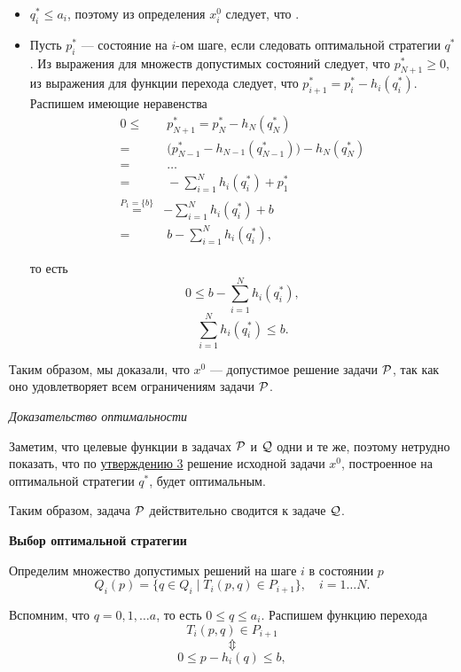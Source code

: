 \begin{itemize}[nosep]
	\item $q_i^* \le a_i$, поэтому из определения $x_i^0$ следует, что .
		
	\item Пусть $p_i^*$ --- состояние на $i$-ом шаге, если следовать оптимальной стратегии $q^*$.  Из выражения для множеств допустимых состояний следует, что $p_{N+1}^* \ge 0$, из выражения для функции перехода следует, что $p_{i+1}^* = p_i^* - h_i (q_i^*)$. Распишем имеющие неравенства
	\begin{align*}
		0 \le& \; p_{N+1}^* = p_N^* - h_N (q_N^*) \\
		=& \; \big(p_{N-1}^* - h_{N-1}(q_{N-1}^*)\big) - h_N (q_N^*) \\
		=& \; \dots \\
		=& \; -\sum_{i=1}^N h_i(q_i^*) + p_1^* \\
		\stackrel{P_1=\{b\}}{=}& -\sum_{i=1}^N h_i(q_i^*) + b \\
		=& \; b - \sum_{i=1}^N h_i(q_i^*),
	\end{align*}
	
	то есть
	\[0 \le b - \sum_{i=1}^N h_i(q_i^*),\]
	\[\boxed{\sum_{i=1}^N h_i(q_i^*) \le b}.\]
\end{itemize}

Таким образом, мы доказали, что $x^0$ --- допустимое решение задачи $\P$, так как оно удовлетворяет всем ограничениям задачи $\P$.

\bigskip

\textit{Доказательство оптимальности}

Заметим, что целевые функции в задачах $\P$ и $\Q$ одни и те же, поэтому нетрудно показать, что по \hyperref[fact:reduction_to_other_problem]{утверждению 3} решение исходной задачи $x^0$, построенное на оптимальной стратегии $q^*$, будет оптимальным.

Таким образом, задача $\P$ действительно сводится к задаче $\Q$.

\bigskip

\textbf{Выбор оптимальной стратегии}

Определим множество допустимых решений на шаге $i$ в состоянии $p$
\[
Q_i(p) = \{q \in Q_i \; \big| \; T_i(p, q) \in P_{i+1}\}, \quad i = 1 \dots N.
\]

Вспомним, что $q = 0, 1, \dots a$, то есть $\boxed{0 \le q \le a_i}$. Распишем функцию перехода
\[
T_i(p, q) \in P_{i+1}
\]
\[
\Updownarrow
\]
\[
0 \le p - h_i(q) \le b,
\]


